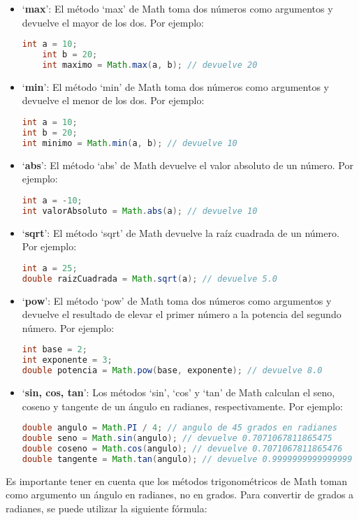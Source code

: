 \documentclass{article}
\begin{document}
\begin{itemize}
    \item \enquote*{\textbf{max}}: El método \enquote*{max} de Math toma dos números como argumentos y devuelve el mayor de los dos. Por ejemplo:
    \begin{lstlisting}[language=Java]
    int a = 10;
    int b = 20;
    int maximo = Math.max(a, b); // devuelve 20
    \end{lstlisting}
    \item \enquote*{\textbf{min}}: El método \enquote*{min} de Math toma dos números como argumentos y devuelve el menor de los dos. Por ejemplo:
\begin{lstlisting}[language=Java]
int a = 10;
int b = 20;
int minimo = Math.min(a, b); // devuelve 10
\end{lstlisting}

\item \enquote*{\textbf{abs}}: El método \enquote*{abs} de Math devuelve el valor absoluto de un número. Por ejemplo:
\begin{lstlisting}[language=Java]
int a = -10;
int valorAbsoluto = Math.abs(a); // devuelve 10
\end{lstlisting}

\item \enquote*{\textbf{sqrt}}: El método \enquote*{sqrt} de Math devuelve la raíz cuadrada de un número. Por ejemplo:
\begin{lstlisting}[language=Java]
int a = 25;
double raizCuadrada = Math.sqrt(a); // devuelve 5.0
\end{lstlisting}

\item \enquote*{\textbf{pow}}: El método \enquote*{pow} de Math toma dos números como argumentos y devuelve el resultado de elevar el primer número a la potencia del segundo número. Por ejemplo:
\begin{lstlisting}[language=Java]
int base = 2;
int exponente = 3;
double potencia = Math.pow(base, exponente); // devuelve 8.0
\end{lstlisting}

\item \enquote*{\textbf{sin, cos, tan}}: Los métodos \enquote*{sin}, \enquote*{cos} y \enquote*{tan} de Math calculan el seno, coseno y tangente de un ángulo en radianes, respectivamente. Por ejemplo:
\begin{lstlisting}[language=Java]
double angulo = Math.PI / 4; // angulo de 45 grados en radianes
double seno = Math.sin(angulo); // devuelve 0.7071067811865475
double coseno = Math.cos(angulo); // devuelve 0.7071067811865476
double tangente = Math.tan(angulo); // devuelve 0.9999999999999999
\end{lstlisting}

\end{itemize}
Es importante tener en cuenta que los métodos trigonométricos de Math toman como argumento un ángulo en radianes, no en grados. Para convertir de grados a radianes, se puede utilizar la siguiente  fórmula:
\end{document}
